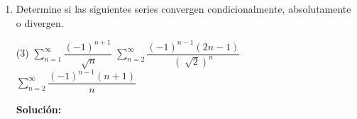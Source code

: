 \documentclass[12pt]{article}
\newenvironment{solucion}
{\begin{mdframed}[backgroundcolor=black!10]
		{\bf Solución:}\\
	}
	{
	\end{mdframed}
}
\newenvironment{preguntas}
{\begin{enumerate}\itemsep12pt
	}
	{
	\end{enumerate}
}
\begin{document}
\begin{preguntas}
\begin{solucion}
$$		= e^{-1} < 1$$
		Por lo tanto, es convergente. De la misma forma, la serie $\sum\limits_{n=1}^{\infty}f(n)$ también lo es.
\\
\\
Otra forma de determinar la convergencia es notando que esta es una serie geométrica con $r = \dfrac{1}{e} < 1$.
\end{solucion}
\item Determine si las siguientes series convergen condicionalmente, absolutamente o divergen.
\begin{tasks}(3)
\task $\sum\limits_{n=1}^{\infty}\dfrac{(-1)^{n+1}}{\sqrt[]{n}}$
\task $\sum\limits_{n=2}^{\infty}\dfrac{(-1)^{n-1}(2n-1)}{(\sqrt[]{2})^n}$
\task $\sum\limits_{n=2}^{\infty}\dfrac{(-1)^{n-1}(n+1)}{n}$
\end{tasks}
\begin{solucion}


\end{solucion}
\end{preguntas}
\end{document}
